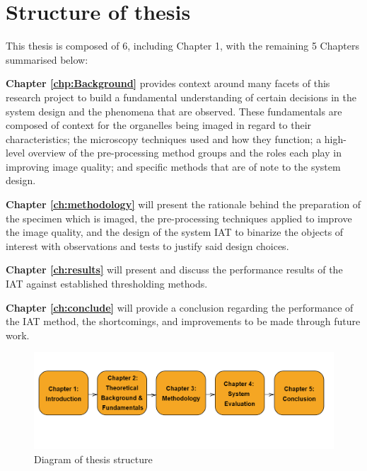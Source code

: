 \section{Structure of thesis}
This thesis is composed of 6, including Chapter 1, with the remaining 5 Chapters summarised below:\par
\textbf{Chapter \ref{chp:Background}} provides context around many facets of this research project to build a fundamental understanding of certain decisions in the system design and the phenomena that are observed. These fundamentals are composed of context for the organelles being imaged in regard to their characteristics; the microscopy techniques used and how they function; a high-level overview of the pre-processing method groups and the roles each play in improving image quality; and specific methods that are of note to the system design.\par
\textbf{Chapter \ref{ch:methodology}} will present the rationale behind the preparation of the specimen which is imaged, the pre-processing techniques applied to improve the image quality, and the design of the system IAT to binarize the objects of interest with observations and tests to justify said design choices.\par
\textbf{Chapter \ref{ch:results}} will present and discuss the performance results of the IAT against established thresholding methods.\par
\textbf{Chapter \ref{ch:conclude}} will provide a conclusion regarding the performance of the IAT method, the shortcomings, and improvements to be made through future work.  

\begin{figure}[h!]
    \centering
    \includegraphics[width=\linewidth]{figs/thesis_structure_diagram.png}
    \caption{Diagram of thesis structure}
    \label{fig:thesis_struct_diag}
\end{figure}
 